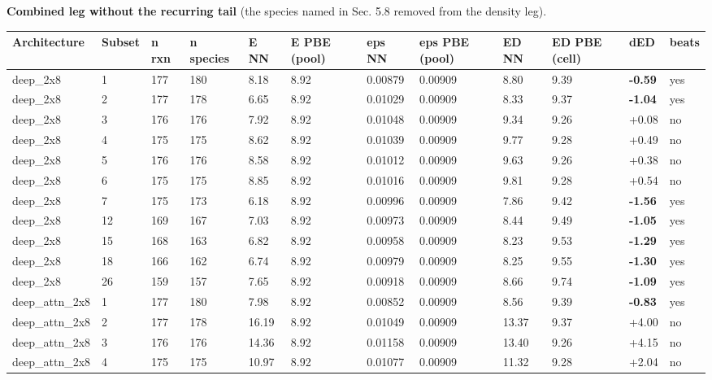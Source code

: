\documentclass[10pt,a4paper]{article}
\begin{document}
\begin{landscape}
\textbf{Combined leg without the recurring tail} (the species named in Sec. 5.8 removed from the density leg).

\begin{scriptsize}
\begin{longtable}{llllllllllll}
\toprule Architecture & Subset & n rxn & n species & E NN & E PBE (pool) & eps NN & eps PBE (pool) & ED NN & ED PBE (cell) & dED & beats \\ \midrule \endhead
deep\_2x8 & 1 & 177 & 180 & 8.18 & 8.92 & 0.00879 & 0.00909 & 8.80 & 9.39 & \textbf{-0.59} & yes \\
deep\_2x8 & 2 & 177 & 178 & 6.65 & 8.92 & 0.01029 & 0.00909 & 8.33 & 9.37 & \textbf{-1.04} & yes \\
deep\_2x8 & 3 & 176 & 176 & 7.92 & 8.92 & 0.01048 & 0.00909 & 9.34 & 9.26 & +0.08 & no \\
deep\_2x8 & 4 & 175 & 175 & 8.62 & 8.92 & 0.01039 & 0.00909 & 9.77 & 9.28 & +0.49 & no \\
deep\_2x8 & 5 & 176 & 176 & 8.58 & 8.92 & 0.01012 & 0.00909 & 9.63 & 9.26 & +0.38 & no \\
deep\_2x8 & 6 & 175 & 175 & 8.85 & 8.92 & 0.01016 & 0.00909 & 9.81 & 9.28 & +0.54 & no \\
deep\_2x8 & 7 & 175 & 173 & 6.18 & 8.92 & 0.00996 & 0.00909 & 7.86 & 9.42 & \textbf{-1.56} & yes \\
deep\_2x8 & 12 & 169 & 167 & 7.03 & 8.92 & 0.00973 & 0.00909 & 8.44 & 9.49 & \textbf{-1.05} & yes \\
deep\_2x8 & 15 & 168 & 163 & 6.82 & 8.92 & 0.00958 & 0.00909 & 8.23 & 9.53 & \textbf{-1.29} & yes \\
deep\_2x8 & 18 & 166 & 162 & 6.74 & 8.92 & 0.00979 & 0.00909 & 8.25 & 9.55 & \textbf{-1.30} & yes \\
deep\_2x8 & 26 & 159 & 157 & 7.65 & 8.92 & 0.00918 & 0.00909 & 8.66 & 9.74 & \textbf{-1.09} & yes \\
deep\_attn\_2x8 & 1 & 177 & 180 & 7.98 & 8.92 & 0.00852 & 0.00909 & 8.56 & 9.39 & \textbf{-0.83} & yes \\
deep\_attn\_2x8 & 2 & 177 & 178 & 16.19 & 8.92 & 0.01049 & 0.00909 & 13.37 & 9.37 & +4.00 & no \\
deep\_attn\_2x8 & 3 & 176 & 176 & 14.36 & 8.92 & 0.01158 & 0.00909 & 13.40 & 9.26 & +4.15 & no \\
deep\_attn\_2x8 & 4 & 175 & 175 & 10.97 & 8.92 & 0.01077 & 0.00909 & 11.32 & 9.28 & +2.04 & no \\

\end{longtable}
\end{scriptsize}
\end{landscape}
\end{document}
